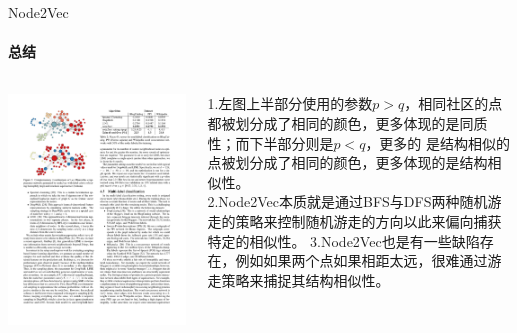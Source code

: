 \documentclass{beamer}
\begin{document}
\begin{frame}{Node2Vec}
    \framesubtitle{总结}
    \begin{columns}
        \begin{column}{0.5\textwidth}
            \centering\includegraphics[width=\textwidth]{node2vec_4.pdf}
        \end{column}
        \begin{column}{0.5\textwidth}
            1.左图上半部分使用的参数$p > q$，相同社区的点都被划分成了相同的颜色，更多体现的是同质性；而下半部分则是$p < q$，更多的
            是结构相似的点被划分成了相同的颜色，更多体现的是结构相似性。\\
            2.Node2Vec本质就是通过BFS与DFS两种随机游走的策略来控制随机游走的方向以此来偏向捕获特定的相似性。
            3.Node2Vec也是有一些缺陷存在，例如如果两个点如果相距太远，很难通过游走策略来捕捉其结构相似性。
        \end{column}
    \end{columns}
\end{frame}
\end{document}
